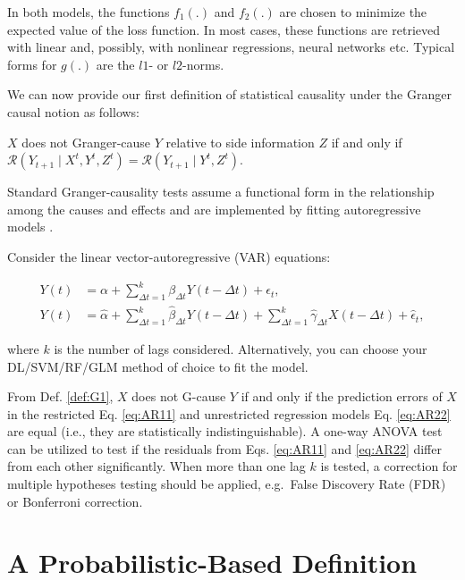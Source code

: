 \documentclass[]{book}
\theoremstyle{definition}
\theoremstyle{definition}
\theoremstyle{definition}
\theoremstyle{remark}
\let\BeginKnitrBlock\begin \let\EndKnitrBlock\end
\begin{document}
In both models, the functions \(f_1(.)\) and \(f_2(.)\) are chosen to
minimize the expected value of the loss function. In most cases, these
functions are retrieved with linear and, possibly, with nonlinear
regressions, neural networks etc. Typical forms for \(g(.)\) are the
\(l1\)- or \(l2\)-norms.

We can now provide our first definition of statistical causality under
the Granger causal notion as follows:

\BeginKnitrBlock{definition}
\protect\hypertarget{def:G1}{}{\label{def:G1} }\(X\) does not Granger-cause
\(Y\) relative to side information \(Z\) if and only if
\(\mathcal{R}(Y_{t+1} \; | \; X^t, Y^t, Z^t) = \mathcal{R}(Y_{t+1} \; | \; Y^t, Z^t)\).
\EndKnitrBlock{definition}

Standard Granger-causality tests assume a functional form in the
relationship among the causes and effects and are implemented by fitting
autoregressive models \citep{Wiener56, granger:econ}.

Consider the linear vector-autoregressive (VAR) equations:

\begin{align}
Y(t) &= {\alpha} + \sum^k_{\Delta t=1}{{\beta}_{\Delta t} Y(t-\Delta t)} + \epsilon_t, \label{eq:AR11}\\
Y(t) &= \widehat{\alpha} + \sum^k_{\Delta t=1}{{\widehat{\beta}}_{\Delta t} Y(t-\Delta t)} +  \sum^k_{\Delta t=1}{{\widehat{\gamma}}_{\Delta t}X(t-\Delta t)}+ \widehat{\epsilon}_t, \label{eq:AR22}
\end{align}

where \(k\) is the number of lags considered. Alternatively, you can
choose your DL/SVM/RF/GLM method of choice to fit the model.

From Def. \ref{def:G1}, \(X\) does not G-cause \(Y\) if and only if the
prediction errors of \(X\) in the restricted Eq. \eqref{eq:AR11} and
unrestricted regression models Eq. \eqref{eq:AR22} are equal (i.e., they
are statistically indistinguishable). A one-way ANOVA test can be
utilized to test if the residuals from Eqs. \eqref{eq:AR11} and
\eqref{eq:AR22} differ from each other significantly. When more than one
lag \(k\) is tested, a correction for multiple hypotheses testing should
be applied, e.g.~False Discovery Rate (FDR) or Bonferroni correction.

\section{A Probabilistic-Based
Definition}\label{a-probabilistic-based-definition}
\end{document}

